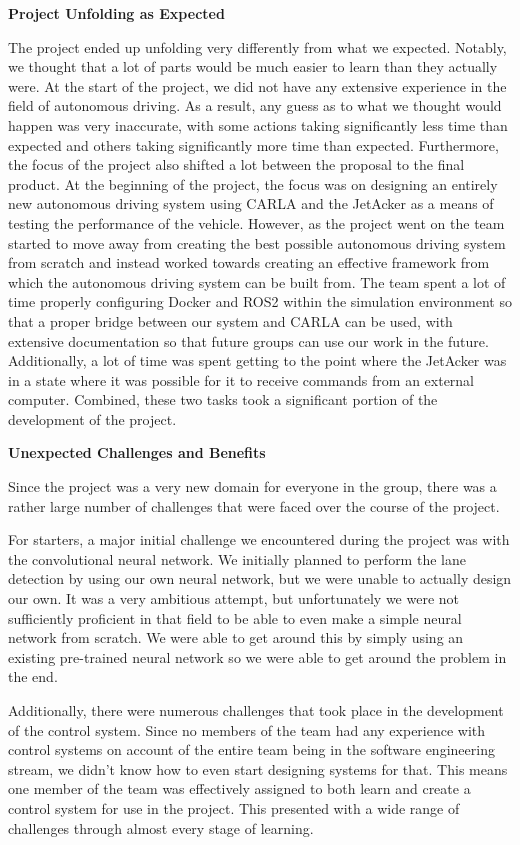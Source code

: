 \documentclass[titlepage,draft]{article}
\begin{document}
{\textbf{Project Unfolding as Expected}

The project ended up unfolding very differently from what we expected. Notably, we thought that a lot of parts would be much easier to learn than they actually were. At the start of the project, we did not have any extensive experience in the field of autonomous driving. As a result, any guess as to what we thought would happen was very inaccurate, with some actions taking significantly less time than expected and others taking significantly more time than expected. Furthermore, the focus of the project also shifted a lot between the proposal to the final product. At the beginning of the project, the focus was on designing an entirely new autonomous driving system using CARLA and the JetAcker as a means of testing the performance of the vehicle. However, as the project went on the team started to move away from creating the best possible autonomous driving system from scratch and instead worked towards creating an effective framework from which the autonomous driving system can be built from. The team spent a lot of time properly configuring Docker and ROS2 within the simulation environment so that a proper bridge between our system and CARLA can be used, with extensive documentation so that future groups can use our work in the future. Additionally, a lot of time was spent getting to the point where the JetAcker was in a state where it was possible for it to receive commands from an external computer. Combined, these two tasks took a significant portion of the development of the project.


\textbf{Unexpected Challenges and Benefits}

Since the project was a very new domain for everyone in the group, there was a rather large number of challenges that were faced over the course of the project.

For starters, a major initial challenge we encountered during the project was with the convolutional neural network. We initially planned to perform the lane detection by using our own neural network, but we were unable to actually design our own. It was a very ambitious attempt, but unfortunately we were not sufficiently proficient in that field to be able to even make a simple neural network from scratch. We were able to get around this by simply using an existing pre-trained neural network so we were able to get around the problem in the end.

Additionally, there were numerous challenges that took place in the development of the control system. Since no members of the team had any experience with control systems on account of the entire team being in the software engineering stream, we didn't know how to even start designing systems for that. This means one member of the team was effectively assigned to both learn and create a control system for use in the project. This presented with a wide range of challenges through almost every stage of learning.

}
\end{document}
